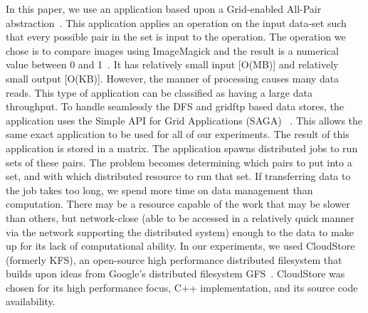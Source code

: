 \documentclass[a4paper,11pt]{article}
\newcommand{\jhanote}[1]{ {\textcolor{red} { ***Jha: #1 }}}
\newcommand{\jhanote}[1]{}
\begin{document}

In this paper, we use an application based upon a Grid-enabled All-Pair
abstraction~\cite{Interop, AllPairs}. This application applies an
operation on the input data-set such that every possible pair in the set
is input to the operation. The operation we chose is to compare images
using ImageMagick and the result is a numerical value between 0 and
1~\cite{imagemagick}. It has relatively small input [O(MB)] and
relatively small output [O(KB)]. However, the manner of processing
causes many data reads. This type of application can be classified as
having a large data throughput. To handle seamlessly the DFS and gridftp
based data stores, the application uses the Simple API for Grid
Applications (SAGA) ~\cite{saga_web}. This allows the same exact
application to be used for all of our experiments. The result of this
application is stored in a matrix. The application spawns distributed
jobs to run sets of these pairs. The problem becomes determining which
pairs to put into a set, and with which distributed resource to run that
set. If transferring data to the job takes too long, we spend more time
on data management than computation. There may be a resource capable of
the work that may be slower than others, but network-close (able to be
accessed in a relatively quick manner via the network supporting the
distributed system) enough to the data to make up for its lack of
computational ability. In our experiments, we used CloudStore (formerly
KFS), an open-source high performance distributed filesystem that builds
upon ideas from Google's distributed filesystem GFS~\cite{kfs_web}.
CloudStore was chosen for its high performance focus, C++
implementation, and its source code availability.
\end{document}
